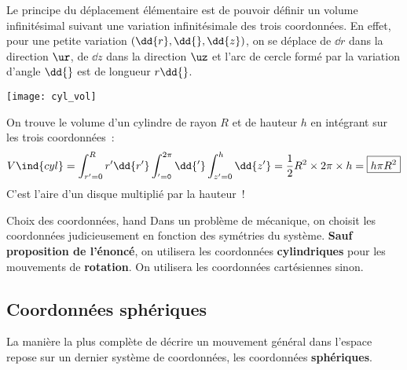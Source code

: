 \documentclass[../main/main.tex]{subfiles}
\begin{document}
\begin{minipage}{0.70\linewidth}
    Le principe du déplacement élémentaire est de pouvoir définir un volume
    infinitésimal suivant une variation infinitésimale des trois coordonnées. En
    effet, pour une petite variation $(\dd{r}, \dd{\tt}, \dd{z})$, on se déplace
    de $\dd{r}$ dans la direction $\ur$, de $\dd{z}$ dans la direction $\uz$ et
    l'arc de cercle formé par la variation d'angle $\dd{\tt}$ est de longueur
    $r\dd{\tt}$. \bigbreak
\end{minipage}
\hfill
\begin{minipage}{0.25\linewidth}
    \begin{center}
        \texttt{[image: cyl\_vol]}
    \end{center}
\end{minipage}

On trouve le volume d'un cylindre de rayon $R$ et de hauteur $h$ en
intégrant sur les trois coordonnées~:
\[V\ind{cyl} = \int_{r'=0}^{R} r'\dd{r'} \int_{\tt'=0}^{2\pi} \dd{\tt'}
    \int_{z'=0}^{h} \dd{z'} = \frac{1}{2}R^2\times 2\pi \times h =
\boxed{h\pi R^2}\]
C'est l'aire d'un disque multiplié par la hauteur~!

\begin{timpo}{Choix des coordonnées, hand}
    Dans un problème de mécanique, on choisit les coordonnées judicieusement en
    fonction des symétries du système. \textbf{Sauf proposition de l'énoncé}, on
    utilisera les coordonnées \textbf{cylindriques} pour les mouvements de
    \textbf{rotation}. On utilisera les coordonnées cartésiennes sinon.
\end{timpo}

\subsection{Coordonnées sphériques}
La manière la plus complète de décrire un mouvement général dans l'espace repose
sur un dernier système de coordonnées, les coordonnées \textbf{sphériques}.
\end{document}
